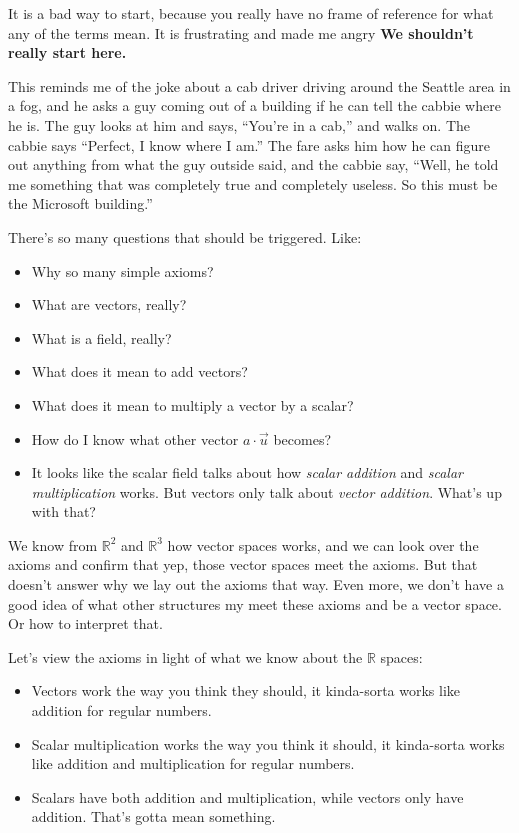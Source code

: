 \documentclass[
]{book}
\providecommand{\tightlist}{%
  \setlength{\itemsep}{0pt}\setlength{\parskip}{0pt}}
\begin{document}
It is a bad way to start, because you really have no frame of reference for what any of the terms mean. It is frustrating and made me angry \textbf{We shouldn't really start here.}

This reminds me of the joke about a cab driver driving around the Seattle area in a fog, and he asks a guy coming out of a building if he can tell the cabbie where he is. The guy looks at him and says, ``You're in a cab,'' and walks on. The cabbie says ``Perfect, I know where I am.'' The fare asks him how he can figure out anything from what the guy outside said, and the cabbie say, ``Well, he told me something that was completely true and completely useless. So this must be the Microsoft building.''

There's so many questions that should be triggered. Like:

\begin{itemize}
\tightlist
\item
  Why so many simple axioms?
\item
  What are vectors, really?
\item
  What is a field, really?
\item
  What does it mean to add vectors?
\item
  What does it mean to multiply a vector by a scalar?
\item
  How do I know what other vector \(a \cdot \vec{u}\) becomes?
\item
  It looks like the scalar field talks about how \emph{scalar addition} and \emph{scalar multiplication} works. But vectors only talk about \emph{vector addition}. What's up with that?
\end{itemize}

We know from \(\mathbb{R}^2\) and \(\mathbb{R}^3\) how vector spaces works, and we can look over the axioms and confirm that yep, those vector spaces meet the axioms. But that doesn't answer why we lay out the axioms that way. Even more, we don't have a good idea of what other structures my meet these axioms and be a vector space. Or how to interpret that.

Let's view the axioms in light of what we know about the \(\mathbb{R}\) spaces:

\begin{itemize}
\tightlist
\item
  Vectors work the way you think they should, it kinda-sorta works like addition for regular numbers.
\item
  Scalar multiplication works the way you think it should, it kinda-sorta works like addition and multiplication for regular numbers.
\item
  Scalars have both addition and multiplication, while vectors only have addition. That's gotta mean something.
\end{itemize}
\end{document}
